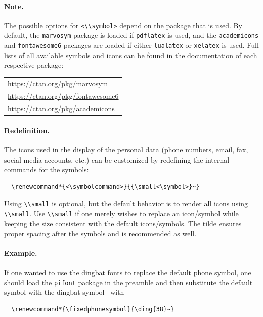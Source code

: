 \documentclass[a4paper, 11pt]{article}
\newcommand{\code}[1]{\lstinline!#1!}
\begin{document}
\paragraph{Note.}
The possible options for \code{<\\symbol>} depend on the package that is used.
By default, the \code{marvosym} package is loaded if \code{pdflatex} is used, and the \code{academicons} and \code{fontawesome6} packages are loaded if either \code{lualatex} or \code{xelatex} is used.
Full lists of all available symbols and icons can be found in the documentation of each respective package:

\begin{tabular}{l}
  \url{https://ctan.org/pkg/marvosym} \\[1ex]
  \url{https://ctan.org/pkg/fontawesome6} \\[1ex]
  \url{https://ctan.org/pkg/academicons}
\end{tabular}

\paragraph{Redefinition.}The icons used in the display of the personal data (phone numbers, email, fax, social media accounts, etc.) can be customized by redefining the internal commands for the symbols:
\begin{lstlisting}
  \renewcommand*{<\symbolcommand>}{{\small<\symbol>}~}
\end{lstlisting}
Using \code{\\small} is optional, but the default behavior is to render all icons using \code{\\small}.
Use \code{\\small} if one merely wishes to replace an icon/symbol while keeping the size consistent with the default icons/symbols.
The tilde ensures proper spacing after the symbols and is recommended as well.

\paragraph{Example.}
If one wanted to use the dingbat fonts to replace the default phone symbol, one should load the \code{pifont} package in the preamble and then substitute the default symbol with the dingbat symbol \ with
\begin{lstlisting}
  \renewcommand*{\fixedphonesymbol}{\ding{38}~}
\end{lstlisting}
\end{document}
